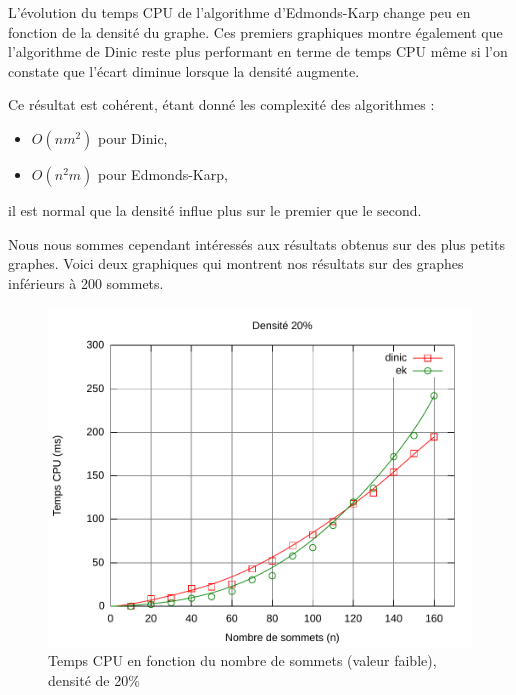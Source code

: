 \FloatBarrier

L'évolution du temps CPU de l'algorithme d'Edmonds-Karp change peu en fonction de la densité du graphe. Ces premiers graphiques montre également que l'algorithme de Dinic reste plus performant en terme de temps CPU même si l'on constate que l'écart diminue lorsque la densité augmente.

Ce résultat est cohérent, étant donné les complexité des algorithmes : 
\begin{itemize}
\item $O(nm^2)$ pour Dinic,
\item $O(n^ 2m)$ pour Edmonds-Karp,
\end{itemize}
il est normal que la densité influe plus sur le premier que le second.

Nous nous sommes cependant intéressés aux résultats obtenus sur des plus petits graphes. Voici deux graphiques qui montrent nos résultats sur des graphes inférieurs à 200 sommets.

\begin{figure}[h!]
\begin{center}
\includegraphics[width=\textwidth]{files/c20_low}
\end{center}
\caption{Temps CPU en fonction du nombre de sommets (valeur faible), densité de 20\%}
\end{figure}

